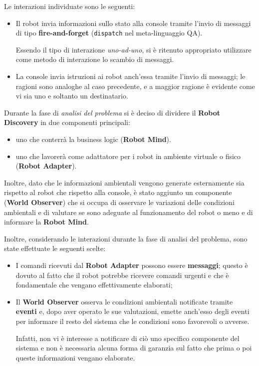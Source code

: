 \documentclass{llncs}
\begin{document}
Le interazioni individuate sono le seguenti:

\begin{itemize}
  \item
    Il robot invia informazioni sullo stato alla console tramite l'invio di messaggi di tipo \textbf{fire-and-forget}
    (\texttt{dispatch} nel meta-linguaggio QA).

    Essendo il tipo di interazione \textit{uno-ad-uno}, si è ritenuto appropriato utilizzare come metodo di interazione lo scambio di messaggi.

  \item
    La console invia istruzioni ai robot anch'essa tramite l'invio di messaggi;
    le ragioni sono analoghe al caso precedente, e a maggior ragione è evidente come vi sia uno e soltanto un destinatario.
\end{itemize}

Durante la fase di \textit{analisi del problema} si è deciso di dividere il \textbf{Robot Discovery} in due componenti principali:

\begin{itemize}
  \item uno che conterrà la business logic (\textbf{Robot Mind}).
  \item uno che lavorerà come adattatore per i robot in ambiente virtuale o fisico (\textbf{Robot Adapter}).
\end{itemize}

Inoltre, dato che le informazioni ambientali vengono generate esternamente sia rispetto al robot che rispetto alla console,
è stato aggiunto un componente (\textbf{World Observer}) che si occupa di osservare le variazioni delle condizioni ambientali e di valutare se sono adeguate al funzionamento del robot o meno e di informare la \textbf{Robot Mind}.

Inoltre, considerando le interazioni durante la fase di analisi del problema, sono state effettuate le seguenti scelte:

\begin{itemize}
    \item
      I comandi ricevuti dal \textbf{Robot Adapter} possono essere \textbf{messaggi};
      questo è dovuto al fatto che il robot potrebbe ricevere comandi urgenti e che è fondamentale che vengano effettivamente elaborati;
    \item
      Il \textbf{World Observer} osserva le condizioni ambientali notificate tramite \textbf{eventi} e, dopo aver operato le sue valutazioni, emette anch'esso degli eventi per informare il resto del sistema che le condizioni sono favorevoli o avverse.

      Infatti, non vi è interesse a notificare di ciò uno specifico componente del sistema e non è necessaria alcuna forma di garanzia sul fatto che prima o poi queste informazioni vengano elaborate.
\end{itemize}
\end{document}
